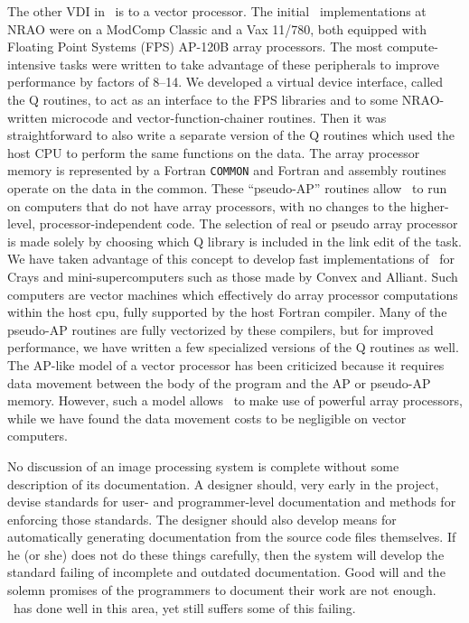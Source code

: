      The other VDI in \AIPS\ is to a vector processor.  The initial
\AIPS\ implementations at NRAO were on a ModComp Classic and a Vax
11/780, both equipped with Floating Point Systems (FPS) AP-120B array
processors.  The most compute-intensive tasks were written to take
advantage of these peripherals to improve performance by factors of 8--14.
We developed a virtual device interface, called the Q routines, to act as
an interface to the FPS libraries and to some NRAO-written microcode and
vector-function-chainer routines.  Then it was straightforward to also
write a separate version of the Q routines which used the host CPU
to perform the same functions on the data.  The array processor memory
is represented by a Fortran {\tt COMMON} and Fortran and assembly
routines operate on the data in the common.  These ``pseudo-AP'' routines
allow \AIPS\ to run on computers that do not have array processors,
with no changes to the higher-level, processor-independent code.
The selection of real or pseudo array processor is made solely by
choosing which Q library is included in the link edit of the task.
We have taken advantage of this concept to develop fast implementations
of \AIPS\ for Crays and mini-supercomputers such as
those made by Convex and Alliant.  Such computers are vector machines
which effectively do array processor computations within the host
cpu, fully supported by the host Fortran compiler.  Many of the
pseudo-AP routines are fully vectorized by these compilers, but for
improved performance, we have written a few specialized versions of
the Q routines as well.  The AP-like model of a vector processor has
been criticized because it requires data movement between the body of
the program and the AP or pseudo-AP memory.  However, such a model
allows \AIPS\ to make use of powerful array processors, while we
have found the data movement costs to be negligible on vector
computers.


     No discussion of an image processing system is complete without
some description of its documentation.  A designer should, very early
in the project, devise standards for user- and programmer-level
documentation and methods for enforcing those standards.  The designer
should also develop means for automatically generating documentation
from the source code files themselves.  If he (or she) does not do
these things carefully, then the system will develop the standard
failing of incomplete and outdated documentation.  Good will and the
solemn promises of the programmers to document their work are not
enough.  \AIPS\ has done well in this area, yet still suffers some
of this failing.

